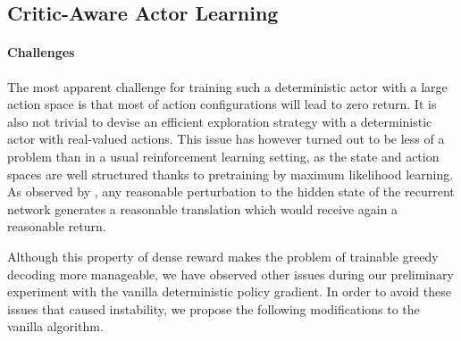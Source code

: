 \subsection{Critic-Aware Actor Learning}

\paragraph{Challenges}

The most apparent challenge for training such a deterministic actor with a large action space is that most of action configurations will lead to zero return. It is also not trivial to devise an efficient exploration strategy with a deterministic actor with real-valued actions. This issue has however turned out to be less of a problem than in a usual reinforcement learning setting, as the state and action spaces are well structured thanks to pretraining by maximum likelihood learning. As observed by \citet{cho2016noisy}, any reasonable perturbation to the hidden state of the recurrent network generates a reasonable translation which would receive again a reasonable return. 

Although this property of dense reward makes the problem of trainable greedy decoding more manageable, we have observed other issues during our preliminary experiment with the vanilla deterministic policy gradient. In order to avoid these issues that caused instability, we propose the following modifications to the vanilla algorithm.



